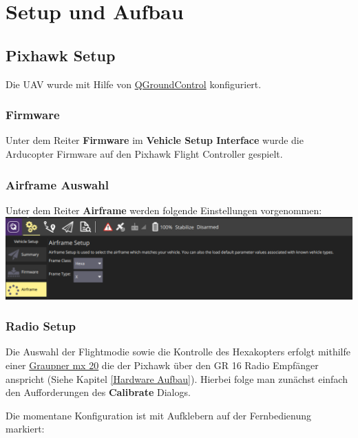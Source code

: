 \documentclass[12pt]{article}
\begin{document}
\section{Setup und Aufbau}

\subsection{Pixhawk Setup}
Die UAV wurde mit Hilfe von \hyperlink{https://docs.qgroundcontrol.com/en/}{QGroundControl} konfiguriert.
\subsubsection{Firmware}
Unter dem Reiter \textbf{Firmware} im \textbf{Vehicle Setup Interface} wurde die Arducopter Firmware %
auf den Pixhawk Flight Controller gespielt.
\subsubsection{Airframe Auswahl}
Unter dem Reiter \textbf{Airframe} werden folgende Einstellungen vorgenommen:
\includegraphics[width=\textwidth]{frame-setup.png}



\subsubsection{Radio Setup}
Die Auswahl der Flightmodie sowie die Kontrolle des Hexakopters erfolgt mithilfe einer \hyperlink{https://www.graupner.de/mediaroot/files/33124_mx20_HoTT_1_Web_DE.pdf}{Graupner mx 20} die der Pixhawk über den GR 16 Radio Empfänger anspricht (Siehe Kapitel \ref{Hardware Aufbau}).
Hierbei folge man zunächst einfach den Aufforderungen des \textbf{Calibrate} Dialogs.

Die momentane Konfiguration ist mit Aufklebern auf der Fernbedienung markiert:

\end{document}
